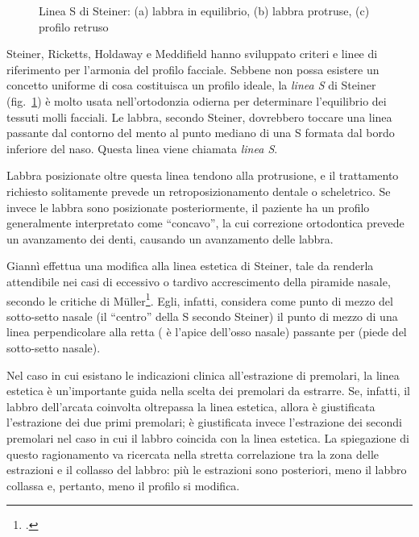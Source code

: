 \begin{figure}[h!]
 \centering
 \caption{Linea S di Steiner: (a) labbra in equilibrio, (b) labbra protruse, (c) profilo retruso}
 \label{fig:steiner_linea_s}
\end{figure}

Steiner, Ricketts, Holdaway e Meddifield hanno sviluppato criteri e linee di riferimento per l'armonia del profilo facciale. Sebbene non possa esistere un concetto uniforme di cosa costituisca un profilo ideale, la \textit{linea S} di Steiner (fig.~\ref{fig:steiner_linea_s}) è molto usata nell'ortodonzia odierna per determinare l'equilibrio dei tessuti molli facciali. Le labbra, secondo Steiner, dovrebbero toccare una linea passante dal contorno del mento al punto mediano di una S formata dal bordo inferiore del naso. Questa linea viene chiamata \textit{linea S}.

Labbra posizionate oltre questa linea tendono alla protrusione, e il trattamento richiesto solitamente prevede un retroposizionamento dentale o scheletrico. Se invece le labbra sono posizionate posteriormente, il paziente ha un profilo generalmente interpretato come ``concavo'', la cui correzione ortodontica prevede un avanzamento dei denti, causando un avanzamento delle labbra.

Giannì effettua una modifica alla linea estetica di Steiner, tale da renderla attendibile nei casi di eccessivo o tardivo accrescimento della piramide nasale, secondo le critiche di Müller\footcite{Mueller1969}. Egli, infatti, considera come punto di mezzo del sotto-setto nasale (il ``centro'' della S secondo Steiner) il punto di mezzo di una linea perpendicolare alla retta  ( è l'apice dell'osso nasale) passante per  (piede del sotto-setto nasale).

Nel caso in cui esistano le indicazioni clinica all'estrazione di premolari, la linea estetica è un'importante guida nella scelta dei premolari da estrarre. Se, infatti, il labbro dell'arcata coinvolta oltrepassa la linea estetica, allora è giustificata l'estrazione dei due primi premolari; è giustificata invece l'estrazione dei secondi premolari nel caso in cui il labbro coincida con la linea estetica. La spiegazione di questo ragionamento va ricercata nella stretta correlazione tra la zona delle estrazioni e il collasso del labbro: più le estrazioni sono posteriori, meno il labbro collassa e, pertanto, meno il profilo si modifica.
